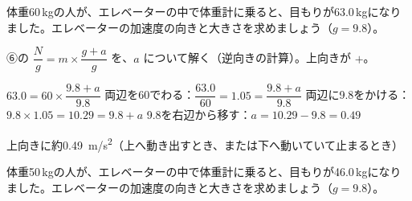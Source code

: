 \begin{reidai}[体重計の目もりから加速度を求める]
体重60\,kgの人が、エレベーターの中で体重計に乗ると、目もりが63.0\,kgになりました。エレベーターの加速度の向きと大きさを求めましょう（$g=9.8$）。\par
\kangaekata ⑥の $\dfrac{N}{g}=m\times\dfrac{g+a}{g}$ を、$a$ について解く（逆向きの計算）。上向きが $+$。\par
\shiki $63.0=60\times\dfrac{9.8+a}{9.8}$\bkvifq
両辺を60でわる：$\dfrac{63.0}{60}=1.05=\dfrac{9.8+a}{9.8}$\bkvifq
両辺に9.8をかける：$9.8\times1.05=10.29=9.8+a$\bkvifq
9.8を右辺から移す：$a=10.29-9.8=0.49$\par
\kotae 上向きに約\qty{0.49}{m/s^2}（上へ動き出すとき、または下へ動いていて止まるとき）
\end{reidai}

\begin{jibun}
体重50\,kgの人が、エレベーターの中で体重計に乗ると、目もりが46.0\,kgになりました。エレベーターの加速度の向きと大きさを求めましょう（$g=9.8$）。
\end{jibun}

